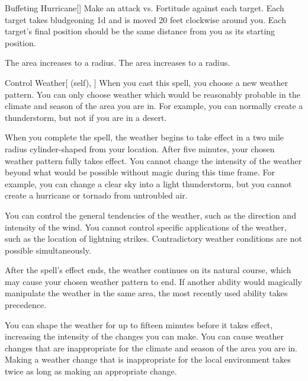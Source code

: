 \lowercase{\hypertarget{spell:Buffeting Hurricane}{}}\label{spell:Buffeting Hurricane}
\begin{freeability}[Rank 4]{\hypertarget{spell:Buffeting Hurricane}{Buffeting Hurricane}}[]
Make an attack vs. Fortitude against each target.
\hit Each target takes bludgeoning  \minus1d and is moved 20 feet clockwise around you.
Each target's final position should be the same distance from you as its starting position.

\rankline
{} The area increases to a \arealarge radius.
 The area increases to a \areahuge radius.
\end{freeability}
\vspace{0.25em}



\lowercase{\hypertarget{spell:Control Weather}{}}\label{spell:Control Weather}
\begin{attuneability}[Rank 4]{\hypertarget{spell:Control Weather}{Control Weather}}[ (self), ]
\targetrule
When you cast this spell, you choose a new weather pattern.
You can only choose weather which would be reasonably probable in the climate and season of the area you are in.
For example, you can normally create a thunderstorm, but not if you are in a desert.

When you complete the spell, the weather begins to take effect in a two mile radius cylinder-shaped  from your location.
After five minutes, your chosen weather pattern fully takes effect.
You cannot change the intensity of the weather beyond what would be possible without magic during this time frame.
For example, you can change a clear sky into a light thunderstorm, but you cannot create a hurricane or tornado from untroubled air.

You can control the general tendencies of the weather, such as the direction and intensity of the wind.
You cannot control specific applications of the weather, such as the location of lightning strikes.
Contradictory weather conditions are not possible simultaneously.

After the spell's effect ends, the weather continues on its natural course, which may cause your chosen weather pattern to end.
If another ability would magically manipulate the weather in the same area, the most recently used ability takes precedence.

\rankline
{} You can shape the weather for up to fifteen minutes before it takes effect, increasing the intensity of the changes you can make.
 You can cause weather changes that are inappropriate for the climate and season of the area you are in.
Making a weather change that is inappropriate for the local environment takes twice as long as making an appropriate change.
\end{attuneability}
\vspace{0.25em}



